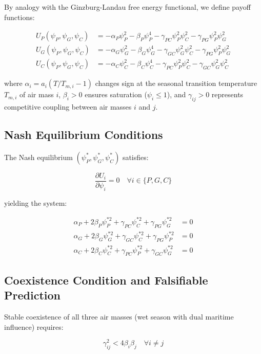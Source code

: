 \documentclass[12pt,a4paper]{article}
\begin{document}
By analogy with the Ginzburg-Landau free energy functional, we define
payoff functions:

\begin{align}
U_P(\psi_P, \psi_G, \psi_C) &= -\alpha_P\psi_P^2 - \beta_P\psi_P^4
  - \gamma_{PC}\psi_P^2\psi_C^2 - \gamma_{PG}\psi_P^2\psi_G^2 \\
U_G(\psi_P, \psi_G, \psi_C) &= -\alpha_G\psi_G^2 - \beta_G\psi_G^4
  - \gamma_{GC}\psi_G^2\psi_C^2 - \gamma_{PG}\psi_P^2\psi_G^2 \\
U_C(\psi_P, \psi_G, \psi_C) &= -\alpha_C\psi_C^2 - \beta_C\psi_C^4
  - \gamma_{PC}\psi_P^2\psi_C^2 - \gamma_{GC}\psi_G^2\psi_C^2
\end{align}

where $\alpha_i = a_i(T/T_{m,i} - 1)$ changes sign at the seasonal
transition temperature $T_{m,i}$ of air mass $i$, $\beta_i > 0$
ensures saturation ($\psi_i \leq 1$), and $\gamma_{ij} > 0$ represents
competitive coupling between air masses $i$ and $j$.

\subsection{Nash Equilibrium Conditions}

The Nash equilibrium $(\psi_P^*, \psi_G^*, \psi_C^*)$ satisfies:

\begin{equation}
\frac{\partial U_i}{\partial \psi_i} = 0 \quad \forall i \in \{P,G,C\}
\end{equation}

yielding the system:

\begin{align}
\alpha_P + 2\beta_P\psi_P^{*2} + \gamma_{PC}\psi_C^{*2}
  + \gamma_{PG}\psi_G^{*2} &= 0 \\
\alpha_G + 2\beta_G\psi_G^{*2} + \gamma_{GC}\psi_C^{*2}
  + \gamma_{PG}\psi_P^{*2} &= 0 \\
\alpha_C + 2\beta_C\psi_C^{*2} + \gamma_{PC}\psi_P^{*2}
  + \gamma_{GC}\psi_G^{*2} &= 0
\end{align}

\subsection{Coexistence Condition and Falsifiable Prediction}

Stable coexistence of all three air masses (wet season with dual
maritime influence) requires:

\begin{equation}
\gamma_{ij}^2 < 4\beta_i\beta_j \quad \forall i \neq j
\end{equation}
\end{document}
